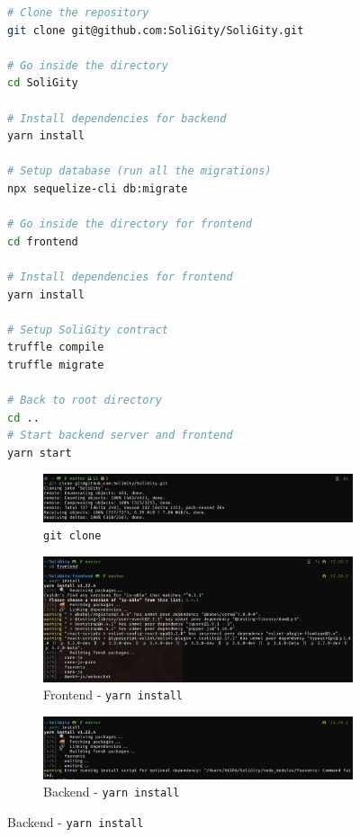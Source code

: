 \documentclass[12pt]{article}
\renewcommand{\_}{\kern-1.5pt\textunderscore\kern-1.5pt}
\begin{document}
\begin{figure}[ht]
	\begin{minipage}[c]{0.4\linewidth}
		\begin{lstlisting}[language=bash]
# Clone the repository
git clone git@github.com:SoliGity/SoliGity.git

# Go inside the directory
cd SoliGity

# Install dependencies for backend
yarn install

# Setup database (run all the migrations)
npx sequelize-cli db:migrate

# Go inside the directory for frontend
cd frontend

# Install dependencies for frontend
yarn install

# Setup SoliGity contract
truffle compile
truffle migrate

# Back to root directory
cd ..
# Start backend server and frontend
yarn start
				\end{lstlisting}
	\end{minipage}\hfill
	\begin{minipage}[c]{0.5\linewidth}
		\centering
		\begin{subfigure}[b]{\textwidth}
			\centering
			\includegraphics[width=\textwidth]{graphs/01. git_clone}
			\caption{\texttt{git clone}}
		\end{subfigure}
		\begin{subfigure}[b]{\textwidth}
			\centering
			\includegraphics[width=\textwidth]{graphs/04. yarn_install_frontend}
			\caption{Frontend - \texttt{yarn install}}
		\end{subfigure}
		\hspace{1em}
		\begin{subfigure}[b]{\textwidth}
			\centering
			\includegraphics[width=\textwidth]{graphs/02. yarn_install_backend}
			\caption{Backend - \texttt{yarn install}}


\end{subfigure}
\end{minipage}
\end{figure}
\end{document}
